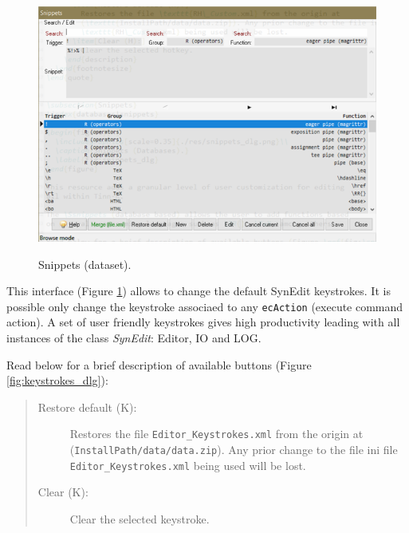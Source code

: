 \begin{figure}[H]
  \includegraphics[scale=.8]{./res/dlg_snippets.png}\\
  \caption{Snippets (dataset).}
  \label{fig:dlg_snippets}
\end{figure}
This interface
(Figure \ref{fig:dlg_snippets})
allows to change the default SynEdit keystrokes.
It is possible only change the keystroke associaed to any \texttt{ecAction} (execute command action).
A set of user friendly keystrokes gives high productivity leading with
all instances of the class \textit{SynEdit}: Editor, IO and LOG.

Read below for a brief description of available buttons (Figure \ref{fig:keystrokes_dlg}):

\begin{quote}
  \begin{footnotesize}
    \begin{description}
      \item[Restore default (K):]
        Restores the file \texttt{Editor\_Keystrokes.xml} from the origin at
        (\texttt{InstallPath/data/data.zip}). Any prior change to the file ini file
        \texttt{Editor\_Keystrokes.xml} being used will be lost.
      \item[Clear (K):]
        Clear the selected keystroke.
    \end{description}
  \end{footnotesize}
\end{quote}

